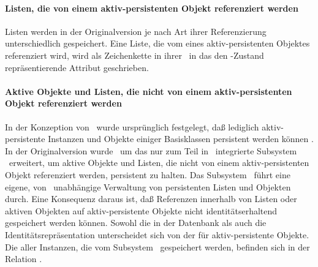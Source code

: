 \paragraph{Listen, die von einem aktiv-persistenten Objekt
referenziert werden}
%
Listen werden in der Originalversion je nach Art ihrer Referenzierung
unterschiedlich gespeichert. Eine Liste, die vom \Slt\/ eines
aktiv-persistenten Objektes referenziert wird, wird als Zeichenkette
in ihrer \ in das
den \Slt\/-Zustand repr\"{a}sentierende Attribut geschrieben.
%
\paragraph{Aktive Objekte und Listen, die nicht von einem
aktiv-persistenten Objekt referenziert werden}
%
\def\store{\lisp{store}}%
%
In der Konzeption von \soh\ wurde urspr\"{u}nglich festgelegt, da\ss{}
lediglich aktiv-persistente Instanzen und Objekte einiger
Basisklassen persistent werden k\"{o}nnen \cite[]{bib:ro87}. In der Originalversion
wurde \soh\ um das nur zum Teil in \soh\ integrierte Subsystem
\store\ erweitert, um aktive Objekte und Listen, die nicht von einem
aktiv-persistenten Objekt referenziert werden, persistent zu halten.
Das Subsystem \store\ f\"{u}hrt eine eigene, von \soh\ unabh\"{a}ngige
Verwaltung von persistenten Listen und Objekten durch. Eine Konsequenz
daraus ist, da\ss{} Referenzen innerhalb von Listen oder aktiven Objekten
auf aktiv-persistente Objekte nicht identit\"{a}tserhaltend gespeichert
werden k\"{o}nnen. Sowohl die \representationform{} in der Datenbank als
auch die Identit\"{a}tsrepr\"{a}sentation unterscheidet sich von der f\"{u}r
aktiv-persistente Objekte. Die \representations{} aller Instanzen, die
vom Subsystem \store\ gespeichert werden, befinden sich in der
Relation .
%
